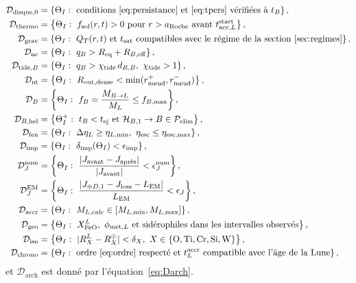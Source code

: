 \documentclass[11pt,a4paper,openany]{report}
\newcommand{\Req}{R_{\mathrm{eq}}}
\newcommand{\aR}{a_{\mathrm{Roche}}}
\begin{document}
\begin{align}
\mathcal{D}_{\mathrm{disque},0}&=\left\{\Theta_I:\ \text{conditions~\eqref{eq:persistance} et~\eqref{eq:tpers} vérifiées à }t_B\right\},
\label{eq:Ddisque}\\
\mathcal{D}_{\mathrm{thermo}}&=\left\{\Theta_I:\ f_{\mathrm{sol}}(r,t)>0\ \text{pour }r>\aR\ \text{avant }
t^{\mathrm{start}}_{\mathrm{acc},L}\right\},
\label{eq:Dthermo}\\
\mathcal{D}_{\mathrm{grav}}&=\left\{\Theta_I:\ Q_T(r,t)\ \text{et}\ t_{\mathrm{sat}}\ \text{compatibles avec le régime de la section~\ref{sec:regimes}}\right\},
\label{eq:Dgrav}\\
\mathcal{D}_{\mathrm{nc}}&=\left\{\Theta_I:\ q_B>\Req+R_{B,\mathrm{eff}}\right\},
\label{eq:Dnc}\\
\mathcal{D}_{\mathrm{tide},B}&=\left\{\Theta_I:\ q_B>\chi_{\mathrm{tide}}\,d_{R,B},\ \chi_{\mathrm{tide}}>1\right\},
\label{eq:DtideB}\\
\mathcal{D}_{\mathrm{nt}}&=\left\{\Theta_I:\ R_{\mathrm{out,dense}}<\min(r^{+}_{\text{nœud}},r^{-}_{\text{nœud}})\right\},
\label{eq:Dnt}\\
\mathcal{D}_{B}&=\left\{\Theta_I:\ f_B=\frac{M_{B\to L}}{M_L}\le f_{B,\max}\right\},
\label{eq:DB}\\
\mathcal{D}_{B,\mathrm{hel}}&=\left\{\Theta_I^{+}:\ t_B<t_{\mathrm{ej}}
\text{ et }\mathcal{H}_{B,1}\to B\in\mathcal{P}_{\mathrm{elim}}\right\},
\label{eq:DBhel}\\
\mathcal{D}_{\mathrm{fen}}&=\left\{\Theta_I:\ \Delta\eta_L\ge\eta_{L,\min},\ \eta_{\mathrm{esc}}\le\eta_{\mathrm{esc},\max}\right\},
\label{eq:Dfen}\\
\mathcal{D}_{\mathrm{imp}}&=\left\{\Theta_I:\ \delta_{\mathrm{imp}}(\Theta_I)<\epsilon_{\mathrm{imp}}\right\},
\label{eq:Dimp}\\
\mathcal{D}_{J}^{\mathrm{num}}&=\left\{\Theta_I:\ \frac{|J_{\mathrm{avant}}-J_{\text{après}}|}{|J_{\mathrm{avant}}|}<\epsilon_J^{\mathrm{num}}\right\},
\label{eq:DJ}\\
\mathcal{D}_{J}^{\mathrm{EM}}&=\left\{\Theta_I:\ \frac{|J_{\oplus D,1}-J_{\mathrm{loss}}-L_{\mathrm{EM}}|}{L_{\mathrm{EM}}}<\epsilon_J\right\},
\label{eq:DJEM}\\
\mathcal{D}_{\mathrm{accr}}&=\left\{\Theta_I:\ M_{L,\mathrm{calc}}\in[M_{L,\min},M_{L,\max}]\right\},
\label{eq:Daccr}\\
\mathcal{D}_{\mathrm{geo}}&=\left\{\Theta_I:\ X^L_{\mathrm{FeO}},\ \phi_{\mathrm{met},L}\ \text{et sidérophiles dans les intervalles observés}\right\},
\label{eq:Dgeo}\\
\mathcal{D}_{\mathrm{iso}}&=\left\{\Theta_I:\ |R_X^L-R_X^\oplus|<\delta_X,\ X\in\{\mathrm{O},\mathrm{Ti},\mathrm{Cr},\mathrm{Si},\mathrm{W}\}\right\},
\label{eq:Diso}\\
\mathcal{D}_{\mathrm{chrono}}&=\left\{\Theta_I:\ \text{ordre~\eqref{eq:ordre} respecté et }
t^{\mathrm{accr}}_L\ \text{compatible avec l'âge de la Lune}\right\},
\label{eq:Dchrono}
\end{align}
et $\mathcal{D}_{\mathrm{arch}}$ est donné par l'équation~\eqref{eq:Darch}.
\end{document}
